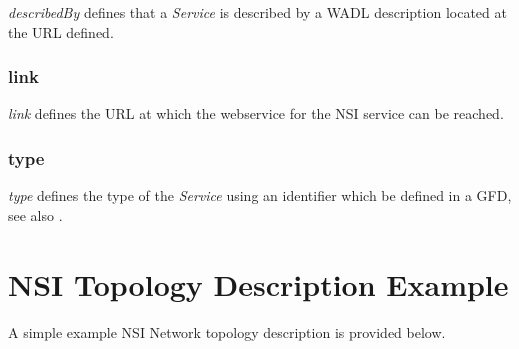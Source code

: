 \documentclass[12pt]{article}  %
\begin{document}
\emph{describedBy} defines that a \emph{Service} is described by a WADL description\cite{w3-wadl} located at the URL defined.


\subsubsection{link} %
\label{ssub:link}

\emph{link} defines the URL at which the webservice for the NSI service can be reached.


\subsubsection{type} %
\label{ssub:type}

\emph{type} defines the type of the \emph{Service} using an identifier which \SHOULD{} be defined in a GFD, see also \cite{gfd-discovery-service}.



\section{NSI Topology Description Example}

 A simple example NSI Network topology description is provided 
below. 
\end{document}
